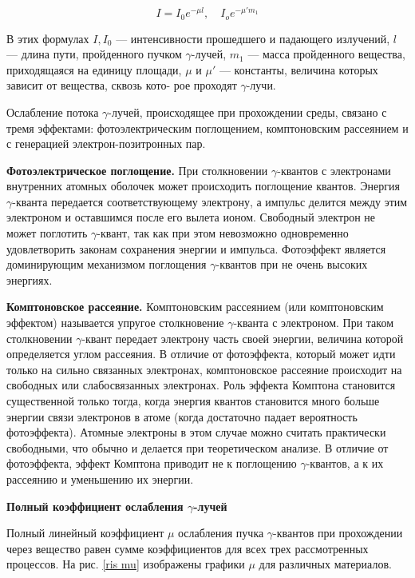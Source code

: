 \documentclass[a4paper, 12pt]{article}%
\begin{document}
	\begin{equation}\label{I(mu)}
		I = I_0 e^{-\mu l}, \quad I_o e^{-\mu 'm_1} 
	\end{equation}
	
	В этих формулах $ I, I_0 $ --- интенсивности прошедшего и падающего излучений, $ l $ --- длина пути, пройденного пучком $\gamma$-лучей, $ m_1 $ ---
	масса пройденного вещества, приходящаяся на единицу площади, $ \mu $ и
	$ \mu' $ --- константы, величина которых зависит от вещества, сквозь кото-
	рое проходят $\gamma$-лучи. 
	
	Ослабление потока $\gamma$-лучей, происходящее при прохождении среды, связано с тремя эффектами: фотоэлектрическим поглощением,
	комптоновским рассеянием и с генерацией электрон-позитронных пар.
	
	\textbf{Фотоэлектрическое поглощение.} При столкновении $\gamma$-квантов с
	электронами внутренних атомных оболочек может происходить поглощение квантов. Энергия $\gamma$-кванта передается соответствующему электрону, а импульс делится между этим электроном и оставшимся после
	его вылета ионом. Свободный электрон не может поглотить $\gamma$-квант,
	так как при этом невозможно одновременно удовлетворить законам
	сохранения энергии и импульса. Фотоэффект является доминирующим механизмом поглощения $\gamma$-квантов при не очень высоких энергиях.
	
	\textbf{Комптоновское рассеяние.} Комптоновским рассеянием (или комптоновским эффектом) называется упругое столкновение $\gamma$-кванта с электроном. При таком столкновении $\gamma$-квант передает электрону часть своей энергии, величина которой определяется углом рассеяния. В отличие от фотоэффекта, который может идти только на сильно связанных электронах, комптоновское рассеяние происходит на свободных или слабосвязанных электронах. Роль эффекта Комптона становится
	существенной только тогда, когда энергия квантов становится много
	больше энергии связи электронов в атоме (когда достаточно падает
	вероятность фотоэффекта). Атомные электроны в этом случае можно
	считать практически свободными, что обычно и делается при теоретическом анализе.
	В отличие от фотоэффекта, эффект
	Комптона приводит не к поглощению $\gamma$-квантов, а к их рассеянию и
	уменьшению их энергии.
	

	
	\textbf{Полный коэффициент ослабления $\gamma$-лучей}
	
	Полный линейный коэффициент $ \mu $ ослабления пучка $\gamma$-квантов при прохождении через вещество равен сумме коэффициентов для всех трех рассмотренных процессов. На рис. \ref{ris mu} изображены графики $ \mu $ для различных материалов.
	
\end{document}
